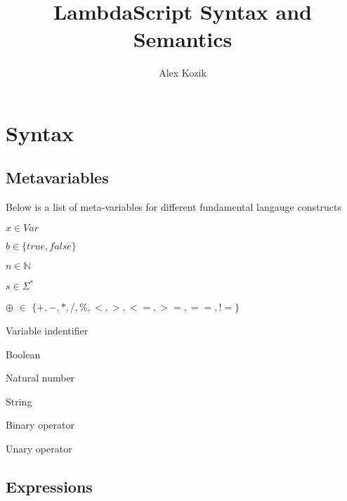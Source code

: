 \documentclass[titlepage]{article}
\title{LambdaScript Syntax and Semantics}
\author{Alex Kozik}
\begin{document}
\newcommand{\desc}[1]{\textit{\textcolor{Aquamarine}{#1}}}



\maketitle
\tableofcontents
\newpage

\section{Syntax}

\subsection{Metavariables}

Below is a list of meta-variables for different fundamental langauge constructs

\begin{minipage}[t]{0.4\textwidth}



$x \in  Var$

$b \in \{true, false\}$

$n \in \mathbb{N}$

$s \in \Sigma ^ *$

$\oplus$ $\in$ $\{+, -, *, /, \%, <, >, <=, >=, ==, !=\}$


\end{minipage}
\begin{minipage}[t]{0.6\textwidth}
Variable indentifier

Boolean

Natural number

String

Binary operator

Unary operator

\end{minipage}
\subsection{Expressions}
\end{document}
